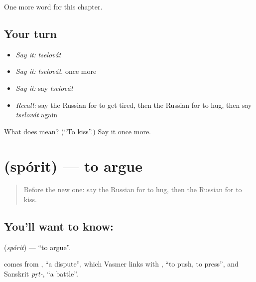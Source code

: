 \begin{grammarlens}[title={What you've built}]
One more word for this chapter.
\end{grammarlens}

\subsection*{Your turn}
\begin{itemize}
\raggedright
  \item \emph{Say it:} \emph{tselovát}
  \item \emph{Say it:} \emph{tselovát}, once more
  \item \emph{Say it:} say \emph{tselovát}
  \item \emph{Recall:} say the Russian for to get tired, then the Russian for to hug, then say \emph{tselovát} again
\end{itemize}

\begin{tcolorbox}[breakable,colback=teal!4,colframe=teal!35!black,title={Before you move on}]
What does  mean? (\textquotedblleft{}To kiss\textquotedblright{}.) Say it once more.
\end{tcolorbox}
\section[\texorpdfstring{\ru{спорить} (spórit)}{спорить (spórit)}]{ (spórit) — to argue}

\label{lesson:RU-C177-sporit}



\begin{quote}
Before the new one: say the Russian for to hug, then the Russian for to kiss.
\end{quote}

\subsection*{You'll want to know: }
\textbf{} (\emph{spórit}) — \textquotedblleft{}to argue\textquotedblright{}.

\begin{cousinweb}
\textbf{} comes from \emph{}, \textquotedblleft{}a dispute\textquotedblright{}, which Vasmer links with \emph{}, \textquotedblleft{}to push, to press\textquotedblright{}, and Sanskrit \emph{pṛt-}, \textquotedblleft{}a battle\textquotedblright{}.
\end{cousinweb}

